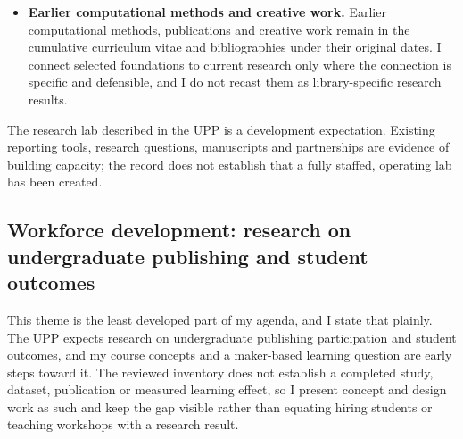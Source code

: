 \begin{itemize}
\item \textbf{Earlier computational methods and creative work.} Earlier computational methods, publications and creative work remain in the cumulative curriculum vitae and bibliographies under their original dates. I connect selected foundations to current research only where the connection is specific and defensible, and I do not recast them as library-specific research results.
\end{itemize}
The research lab described in the UPP is a development expectation. Existing reporting tools, research questions, manuscripts and partnerships are evidence of building capacity; the record does not establish that a fully staffed, operating lab has been created.

\subsection{Workforce development: research on undergraduate publishing and student outcomes}
This theme is the least developed part of my agenda, and I state that plainly. The UPP expects research on undergraduate publishing participation and student outcomes, and my course concepts and a maker-based learning question are early steps toward it. The reviewed inventory does not establish a completed study, dataset, publication or measured learning effect, so I present concept and design work as such and keep the gap visible rather than equating hiring students or teaching workshops with a research result.

